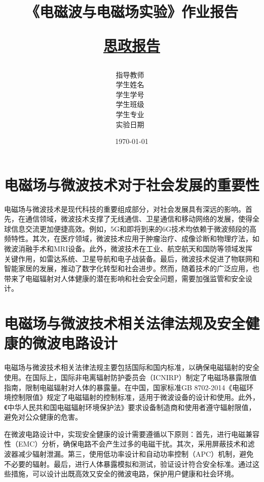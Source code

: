 \documentclass[12pt,hyperref,a4paper,UTF8]{ctexart}
\title{ 
        \vspace{1cm}
        \heiti \Huge \textbf{《电磁波与电磁场实验》作业报告} \par
        \vspace{1cm} 
        \heiti \Large {\underline{思政报告}   }     
    }
\author{
        \kaishu\Large 指导教师\ \dlmu[9cm]{吴爱婷}  \\
        \kaishu\Large 学生姓名\ \dlmu[9cm]{陈文轩} \\ %
        \kaishu\Large 学生学号\ \dlmu[9cm]{23040447} \\ %
        \kaishu\Large 学生班级\ \dlmu[9cm]{23186011} \\ %
        \kaishu\Large 学生专业\ \dlmu[9cm]{智能硬件与系统(电子信息工程)} \qquad  \\ %
        \kaishu\Large 实验日期\ \dlmu[9cm]{2025.10.20} \qquad \\
    }
\date{\today} %
\begin{document}
\cover
\thispagestyle{empty} %







\newpage
\setcounter{page}{1} %


\section{电磁场与微波技术对于社会发展的重要性}

电磁场与微波技术是现代科技的重要组成部分，对社会发展具有深远的影响。首先，在通信领域，微波技术支撑了无线通信、卫星通信和移动网络的发展，使得全球信息交流更加便捷高效。例如，5G和即将到来的6G技术均依赖于微波频段的高频特性。其次，在医疗领域，微波技术应用于肿瘤治疗、成像诊断和物理疗法，如微波消融手术和MRI设备。此外，微波技术在工业、航空航天和国防等领域发挥关键作用，如雷达系统、卫星导航和电子战装备。最后，微波技术促进了物联网和智能家居的发展，推动了数字化转型和社会进步。然而，随着技术的广泛应用，也带来了电磁辐射对人体健康的潜在影响和社会安全问题，需要加强监管和安全设计。

\section{电磁场与微波技术相关法律法规及安全健康的微波电路设计}

电磁场与微波技术相关法律法规主要包括国际和国内标准，以确保电磁辐射的安全使用。在国际上，国际非电离辐射防护委员会（ICNIRP）制定了电磁场暴露限值指南，限制电磁辐射对人体的暴露量。在中国，国家标准GB 8702-2014《电磁环境控制限值》规定了电磁辐射的控制标准，适用于微波设备的设计和使用。此外，《中华人民共和国电磁辐射环境保护法》要求设备制造商和使用者遵守辐射限值，避免对公众健康的危害。

在微波电路设计中，实现安全健康的设计需要遵循以下原则：首先，进行电磁兼容性（EMC）分析，确保电路不会产生过多的电磁干扰。其次，采用屏蔽技术和滤波器减少辐射泄漏。第三，使用低功率设计和自动功率控制（APC）机制，避免不必要的辐射。最后，进行人体暴露模拟和测试，验证设计符合安全标准。通过这些措施，可以设计出既高效又安全的微波电路，保护用户健康和社会环境。
\end{document}
